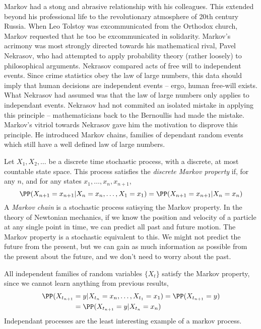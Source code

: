 Markov had a stong and abrasive relationship with his colleagues. This extended beyond his professional life to the revolutionary atmosphere of 20th century Russia. When Leo Tolstoy was excommunicated from the Orthodox church, Markov requested that he too be excommunicated in solidarity. Markov's acrimony was most strongly directed towards his mathematical rival, Pavel Nekrasov, who had attempted to apply probability theory (rather loosely) to philosophical arguments. Nekrasov compared acts of free will to independent events. Since crime statistics obey the law of large numbers, this data should imply that human decisions are independent events -- ergo, human free-will exists. What Nekrasov had assumed was that the law of large numbers only applies to independant events. Nekrasov had not commited an isolated mistake in applying this principle -- mathematicians back to the Bernoullis had made the mistake. Markov's vitriol towards Nekrasov gave him the motivation to disprove this principle. He introduced Markov chains, families of dependant random events which still have a well defined law of large numbers.

Let $X_1, X_2, \dots$ be a discrete time stochastic process, with a discrete, at most countable state space. This process satisfies the \emph{discrete Markov property} if, for any $n$, and for any states $x_1, \dots, x_n, x_{n+1}$,
%
\[ \PP(X_{n+1} = x_{n+1} | X_n = x_n, \dots, X_1 = x_1) = \PP(X_{n+1} = x_{n+1} | X_n = x_n) \]
%
A \emph{Markov chain} is a stochastic process satisying the Markov property. In the theory of Newtonian mechanics, if we know the position and velocity of a particle at any single point in time, we can predict all past and future motion. The Markov property is a stochastic equivalent to this. We might not predict the future from the present, but we can gain as much information as possible from the present about the future, and we don't need to worry about the past.

\begin{example}
    All independent families of random variables $\{ X_t \}$ satisfy the Markov property, since we cannot learn anything from previous results,
    \begin{align*}
        \PP(X_{t_{n+1}} &= y | X_{t_n} = x_n, \dots, X_{t_1} = x_1) = \PP(X_{t_{n+1}} = y)\\
        &= \PP(X_{t_{n+1}} = y | X_{t_n} = x_n)
    \end{align*}
    Independant processes are the least interesting example of a markov process.
\end{example}

